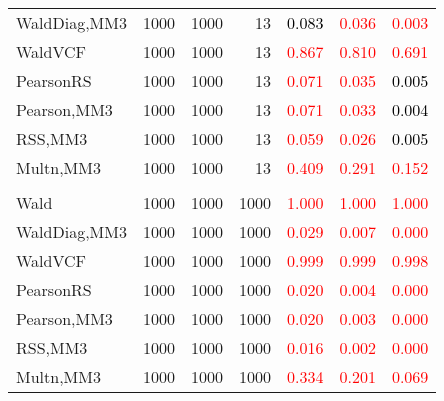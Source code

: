 \documentclass[
]{article}
\begin{document}
\begin{table}[H]
{\begin{tabular}[t]{lrrrrrr}
\hspace{1em}WaldDiag,MM3 & 1000 & 1000 & 13 & \textcolor{black}{0.083} & \textcolor{red}{0.036} & \textcolor{red}{0.003}\\
\hspace{1em}WaldVCF & 1000 & 1000 & 13 & \textcolor{red}{0.867} & \textcolor{red}{0.810} & \textcolor{red}{0.691}\\
\hspace{1em}PearsonRS & 1000 & 1000 & 13 & \textcolor{red}{0.071} & \textcolor{red}{0.035} & \textcolor{black}{0.005}\\
\hspace{1em}Pearson,MM3 & 1000 & 1000 & 13 & \textcolor{red}{0.071} & \textcolor{red}{0.033} & \textcolor{black}{0.004}\\
\hspace{1em}RSS,MM3 & 1000 & 1000 & 13 & \textcolor{red}{0.059} & \textcolor{red}{0.026} & \textcolor{black}{0.005}\\
\hspace{1em}Multn,MM3 & 1000 & 1000 & 13 & \textcolor{red}{0.409} & \textcolor{red}{0.291} & \textcolor{red}{0.152}\\
\addlinespace[0.3em]
\multicolumn{7}{l}{\textbf{1F 15V}}\\
\hspace{1em}Wald & 1000 & 1000 & 1000 & \textcolor{red}{1.000} & \textcolor{red}{1.000} & \vphantom{2} \textcolor{red}{1.000}\\
\hspace{1em}WaldDiag,MM3 & 1000 & 1000 & 1000 & \textcolor{red}{0.029} & \textcolor{red}{0.007} & \textcolor{red}{0.000}\\
\hspace{1em}WaldVCF & 1000 & 1000 & 1000 & \textcolor{red}{0.999} & \textcolor{red}{0.999} & \textcolor{red}{0.998}\\
\hspace{1em}PearsonRS & 1000 & 1000 & 1000 & \textcolor{red}{0.020} & \textcolor{red}{0.004} & \textcolor{red}{0.000}\\
\hspace{1em}Pearson,MM3 & 1000 & 1000 & 1000 & \textcolor{red}{0.020} & \textcolor{red}{0.003} & \textcolor{red}{0.000}\\
\hspace{1em}RSS,MM3 & 1000 & 1000 & 1000 & \textcolor{red}{0.016} & \textcolor{red}{0.002} & \textcolor{red}{0.000}\\
\hspace{1em}Multn,MM3 & 1000 & 1000 & 1000 & \textcolor{red}{0.334} & \textcolor{red}{0.201} & \textcolor{red}{0.069}\\

\end{tabular}}
\end{table}
\end{document}
